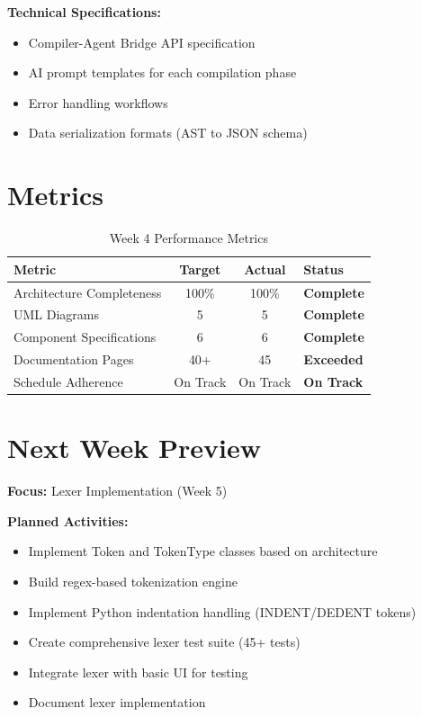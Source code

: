 \documentclass[a4paper,11pt]{article}
\newcommand{\statusgood}[1]{\colorbox{green!20}{\textbf{#1}}}
\begin{document}
\textbf{Technical Specifications:}
\begin{itemize}[leftmargin=*]
    \item Compiler-Agent Bridge API specification
    \item AI prompt templates for each compilation phase
    \item Error handling workflows
    \item Data serialization formats (AST to JSON schema)
\end{itemize}

\section{Metrics}

\begin{table}[h]
\centering
\begin{tabularx}{\textwidth}{|l|c|c|X|}
\hline
\rowcolor{blue!10}
\textbf{Metric} & \textbf{Target} & \textbf{Actual} & \textbf{Status} \\
\hline
Architecture Completeness & 100\% & 100\% & \statusgood{Complete} \\
\hline
UML Diagrams & 5 & 5 & \statusgood{Complete} \\
\hline
Component Specifications & 6 & 6 & \statusgood{Complete} \\
\hline
Documentation Pages & 40+ & 45 & \statusgood{Exceeded} \\
\hline
Schedule Adherence & On Track & On Track & \statusgood{On Track} \\
\hline
\end{tabularx}
\caption{Week 4 Performance Metrics}
\end{table}

\section{Next Week Preview}

\textbf{Focus:} Lexer Implementation (Week 5)

\textbf{Planned Activities:}
\begin{itemize}[leftmargin=*]
    \item Implement Token and TokenType classes based on architecture
    \item Build regex-based tokenization engine
    \item Implement Python indentation handling (INDENT/DEDENT tokens)
    \item Create comprehensive lexer test suite (45+ tests)
    \item Integrate lexer with basic UI for testing
    \item Document lexer implementation
\end{itemize}
\end{document}
